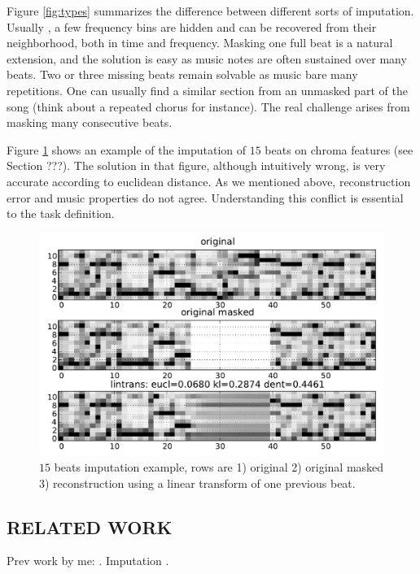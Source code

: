 \documentclass{article}
\begin{document}
Figure \ref{fig:types} summarizes the difference between different sorts of imputation.
Usually \cite{Smaragdis2009}, a few frequency bins are hidden and can be recovered from
their neighborhood, both in time and frequency. Masking one full beat is a natural extension,
and the solution is easy as music notes are often sustained over many beats. Two or three
missing beats remain solvable as music bare many repetitions. One can usually find a similar
section from an unmasked part of the song (think about a repeated chorus for instance).
The real challenge arises from masking many consecutive beats.

Figure \ref{fig:basic} shows an example of the imputation of $15$ beats on chroma features
(see Section ???). The solution in that figure, although intuitively wrong, is very
accurate according to euclidean distance. As we mentioned above, reconstruction error and
music properties do not agree. Understanding this conflict is essential to the task
definition.

\begin{figure}[t]
\begin{center}
\includegraphics[width=.95\columnwidth]{basic}
\end{center}
\caption{$15$ beats imputation example, rows are 1) original 2) original masked
3) reconstruction using a linear transform of one previous beat.
\label{fig:basic}}
\end{figure}


\subsection{RELATED WORK} 
\label{ssec:relwork}

Prev work by me: \cite{Bertin-Mahieux2010a}. Imputation \cite{Smaragdis2009,Hoffman2010}.
\end{document}
